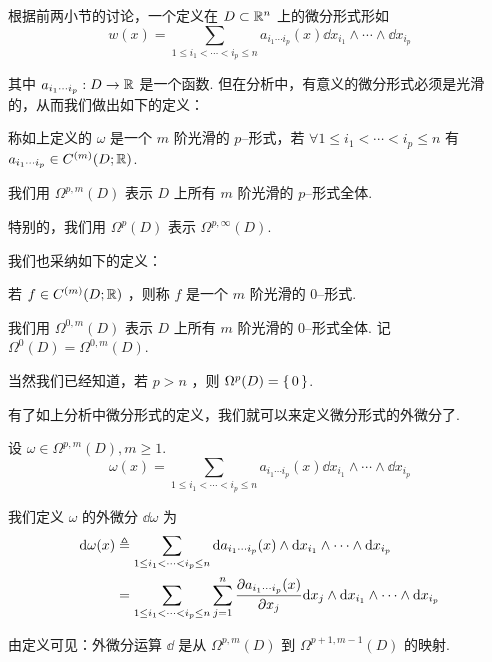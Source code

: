 
根据前两小节的讨论，一个定义在 $D\subset\mathbb{R}^n$ 上的微分形式形如
$$
w(x)=\sum_{1\le i_1<\cdots<i_p\le n}a_{i_1\cdots i_p}(x)\dd x_{i_1}\wedge\cdots\wedge\dd x_{i_p}
$$

其中 $a_{i_1\cdots i_p}:D\to\mathbb{R}$ 是一个函数. 但在分析中，有意义的微分形式必须是光滑的，从而我们做出如下的定义：

\begin{definition}
    称如上定义的 $\omega$ 是一个 $m$ 阶光滑的 $p$--形式，若 $\forall 1\le i_1<\cdots<i_p\le n$ 有 $a_{i_1\cdots i_p}\in C^{(m)}(D;\mathbb{R})$.

    我们用 $\Omega^{p,m}(D)$ 表示 $D$ 上所有 $m$ 阶光滑的 $p$--形式全体.

    特别的，我们用 $\Omega^p(D)$ 表示 $\Omega^{p,\infty}(D)$.
\end{definition}

我们也采纳如下的定义：

\begin{definition}
    若 $f\in C^{(m)}(D;\mathbb{R})$ ，则称 $f$ 是一个 $m$ 阶光滑的 $0$--形式.

    我们用 $\Omega^{0,m}(D)$ 表示 $D$ 上所有 $m$ 阶光滑的 $0$--形式全体. 记 $\Omega^0(D)=\Omega^{0,m}(D)$.
\end{definition}

\begin{hint}
    当然我们已经知道，若 $p>n$ ，则 $\Omega^p(D)=\set{0}$.
\end{hint}

有了如上分析中微分形式的定义，我们就可以来定义微分形式的外微分了.

\begin{definition}
    设 $\omega\in\Omega^{p,m}(D),m\ge 1$.
$$
\omega(x)=\sum_{1\le i_1<\cdots<i_p\le n}a_{i_1\cdots i_p}(x)\dd x_{i_1}\wedge\cdots\wedge\dd x_{i_p}
$$

    我们定义 $\omega$ 的外微分 $\dd\omega$ 为
$$
\begin{aligned}
    \mathrm{d}\omega(x)&\triangleq\sum_{1\le i_1<\cdots<i_p\le n}\mathrm{d} a_{i_1\cdots i_p}(x)\wedge\mathrm{d} x_{i_1}\wedge\cdots\wedge\mathrm{d} x_{i_p}\\
    &=\sum_{1\le i_1<\cdots<i_p\le n}\sum_{j=1}^n\frac{\partial{a_{i_1\cdots i_p}(x)}}{\partial{x_j}}\mathrm{d} x_j\wedge\mathrm{d} x_{i_1}\wedge\cdots\wedge\mathrm{d} x_{i_p}
\end{aligned}
$$
\end{definition}

由定义可见：外微分运算 $\dd$ 是从 $\Omega^{p,m}(D)$ 到 $\Omega^{p+1,m-1}(D)$ 的映射.

